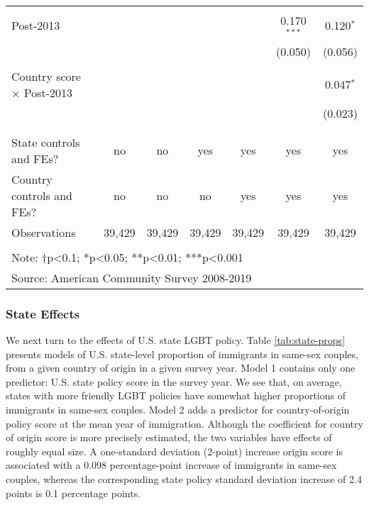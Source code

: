 \documentclass[
  11pt,
]{article}
\begin{document}
\begin{table}[!htbp]
\begin{tabular}{@{\extracolsep{5pt}}lcccccc}
  & & & & & & \\ 
 Post-2013 &  &  &  &  & 0.170$^{***}$ & 0.120$^{*}$ \\ 
  &  &  &  &  & (0.050) & (0.056) \\ 
  & & & & & & \\ 
 Country score × Post-2013 &  &  &  &  &  & 0.047$^{*}$ \\ 
  &  &  &  &  &  & (0.023) \\ 
  & & & & & & \\ 
\hline \\[-1.8ex] 
State controls and FEs? & no & no & yes & yes & yes & yes \\ 
Country controls and FEs? & no & no & no & yes & yes & yes \\ 
Observations & 39,429 & 39,429 & 39,429 & 39,429 & 39,429 & 39,429 \\ 
\hline 
\hline \\[-1.8ex] 
\multicolumn{7}{l}{Note: †p<0.1; *p<0.05; **p<0.01; ***p<0.001} \\ 
\multicolumn{7}{l}{Source: American Community Survey 2008-2019} \\ 
\end{tabular} 
\end{table}

\hypertarget{state-effects}{%
\subsubsection{State Effects}\label{state-effects}}

We next turn to the effects of U.S. state LGBT policy. Table \ref{tab:state-props} presents models of U.S. state-level proportion of immigrants in same-sex couples, from a given country of origin in a given survey year. Model 1 contains only one predictor: U.S. state policy score in the survey year. We see that, on average, states with more friendly LGBT policies have somewhat higher proportions of immigrants in same-sex couples. Model 2 adds a predictor for country-of-origin policy score at the mean year of immigration. Although the coefficient for country of origin score is more precisely estimated, the two variables have effects of roughly equal size. A one-standard deviation (2-point) increase origin score is associated with a 0.098 percentage-point increase of immigrants in same-sex couples, whereas the corresponding state policy standard deviation increase of 2.4 points is 0.1 percentage points.
\end{document}

